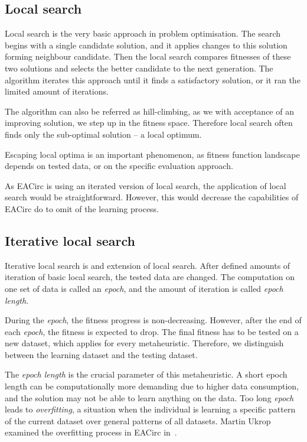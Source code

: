 \documentclass[
  print, %
  Table,   %
  nolof,     %
  nolot,     %
  11pt, %
  oneside  %
]{fithesis3}
\begin{document}
\subsection{Local search}
\label{subsec:opt-single-sol-ls}

Local search is the very basic approach in problem optimisation. The search begins with a single candidate solution, and it applies changes to this solution forming neighbour candidate. Then the local search compares fitnesses of these two solutions and selects the better candidate to the next generation. The algorithm iterates this approach until it finds a satisfactory solution, or it ran the limited amount of iterations.

The algorithm can also be referred as hill-climbing, as we with acceptance of an improving solution, we step up in the fitness space. Therefore local search often finds only the sub-optimal solution -- a local optimum.

Escaping local optima is an important phenomenon, as fitness function landscape depends on tested data, or on the specific evaluation approach.

As EACirc is using an iterated version of local search, the application of local search would be straightforward. However, this would decrease the capabilities of EACirc do to omit of the learning process.

\subsection{Iterative local search}
\label{subsec:opt-single-sol-ils}

Iterative local search is and extension of local search. After defined amounts of iteration of basic local search, the tested data are changed. The computation on one set of data is called an \textit{epoch}, and the amount of iteration is called \textit{epoch length}.

During the \textit{epoch}, the fitness progress is non-decreasing. However, after the end of each \textit{epoch}, the fitness is expected to drop. The final fitness has to be tested on a new dataset, which applies for every metaheuristic. Therefore, we distinguish between the learning dataset and the testing dataset.

The \textit{epoch length} is the crucial parameter of this metaheuristic. A short epoch length can be computationally more demanding due to higher data consumption, and the solution may not be able to learn anything on the data. Too long \textit{epoch} leads to \textit{overfitting}, a situation when the individual is learning a specific pattern of the current dataset over general patterns of all datasets. Martin Ukrop examined the overfitting process in EACirc in~\cite[Chapter~7]{ukropBcThesis}.
\end{document}
